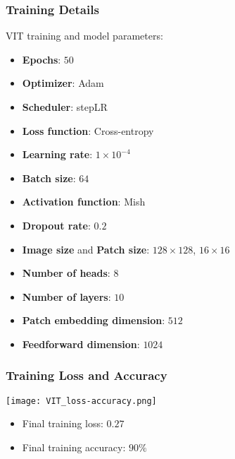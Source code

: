 \documentclass[../presentation.tex]{subfiles} %
\begin{document}
\begin{frame}[t]
    
    \frametitle{Training Details}

    VIT training and model parameters:
    \begin{itemize}
        \item \textbf{Epochs}: $50$
				\item \textbf{Optimizer}: Adam 
				\item \textbf{Scheduler}: stepLR 
        \item \textbf{Loss function}: Cross-entropy
        \item \textbf{Learning rate}: $1\times10^{-4}$
				\item \textbf{Batch size}: $64$ 
        \item \textbf{Activation function}: Mish
        \item \textbf{Dropout rate}: $0.2$
        \item \textbf{Image size} and \textbf{Patch size}: $128\times128$, $16\times16$
        \item \textbf{Number of heads}: $8$
        \item \textbf{Number of layers}: $10$
        \item \textbf{Patch embedding dimension}: $512$
        \item \textbf{Feedforward dimension}: $1024$
    \end{itemize}

\end{frame}

\begin{frame}
    
    \frametitle{Training Loss and Accuracy}

    \begin{center}
        \texttt{[image: VIT\_loss-accuracy.png]}
    \end{center}

    \small{
    \begin{cbox}
        \begin{itemize}
            \item Final training loss: $0.27$
            \item Final training accuracy: $90\%$
        \end{itemize}
    \end{cbox}
    }

\end{frame}
\end{document}

